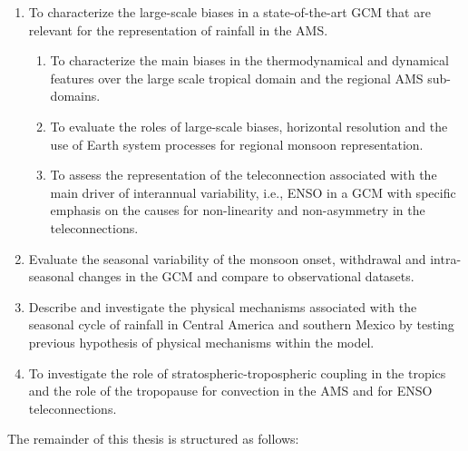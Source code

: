 \begin{enumerate}
\item To characterize the large-scale biases in a state-of-the-art GCM that are relevant for the representation of rainfall in the AMS.  
\begin{enumerate}
\item To characterize the main biases in the thermodynamical and dynamical features over the large scale tropical domain and the regional AMS sub-domains.
\item To evaluate the roles of large-scale biases, horizontal resolution and the use of Earth system processes for regional monsoon representation.
\item To assess the representation of the teleconnection associated with the main driver of interannual variability, i.e., ENSO in a GCM with specific emphasis on the causes for non-linearity and non-asymmetry in the teleconnections.
\end{enumerate}
\item Evaluate the seasonal variability of the monsoon onset, withdrawal and intra-seasonal changes in the GCM and compare to observational datasets. 
\item Describe and investigate the physical mechanisms associated with the seasonal cycle of rainfall in Central America and southern Mexico by testing previous hypothesis of physical mechanisms within the model.
\item To investigate the role of stratospheric-tropospheric coupling in the tropics and the role of the tropopause for convection in the AMS and for ENSO teleconnections.
\end{enumerate}

The remainder of this thesis is structured as follows:

